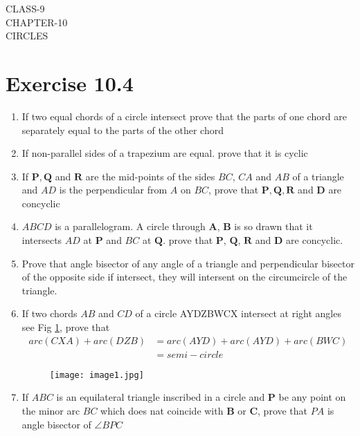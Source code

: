 \documentclass[12pt]{article}
\providecommand{\brak}[1]{\ensuremath{\left(#1\right)}}
\let\vec\mathbf
\begin{document}
\begin{center}
\textbf\large{CLASS-9\\CHAPTER-10 \\ CIRCLES}
\end{center}
\section*{Exercise 10.4}
\begin{enumerate}
\item If two equal chords of a circle intersect prove that the parts of one chord are separately equal to the parts of the other chord
\item If non-parallel sides of a trapezium are equal. prove that it is cyclic
\item If $\vec{P},\vec{Q}$ and $\vec{R}$ are the mid-points of the sides $BC$, $CA$ and $AB$ of a triangle and $AD$ is the perpendicular from $A$ on $BC$, prove that $\vec{P},\vec{Q},\vec{R}$ and $\vec{D}$ are concyclic
\item $ABCD$ is a parallelogram. A circle through $\vec{A}$, $\vec{B}$ is so drawn that it intersects $AD$ at $\vec{P}$ and $BC$ at $\vec{Q}$. prove that $\vec{P}$, $\vec{Q}$, $\vec{R}$ and $\vec{D}$ are concyclic.
\item Prove that angle bisector of any angle of a triangle and perpendicular bisector of the opposite side if intersect, they will intersent on the circumcircle of the triangle.
\item If two chords $AB$ and $CD$ of a circle AYDZBWCX intersect at right angles see Fig \ref{fig:1}, prove that
	\begin{align*}
		arc\brak{CXA}+arc\brak{DZB}&=arc\brak{AYD}+arc\brak{AYD}+arc\brak{BWC}\\&=semi-circle
	\end{align*}
	\begin{figure}[h!]                        \begin{center}                                   \texttt{[image: image1.jpg]}                          \end{center}                            \caption{}                                       \label{fig:1}                    \end{figure}
	\item If $ABC$ is an equilateral triangle inscribed in a circle and $\vec{P}$ be any point on the minor arc $BC$ which does nat coincide with $\vec{B}$ or $\vec{C}$, prove that $PA$ is angle bisector of $\angle BPC$

\end{enumerate}
\end{document}
